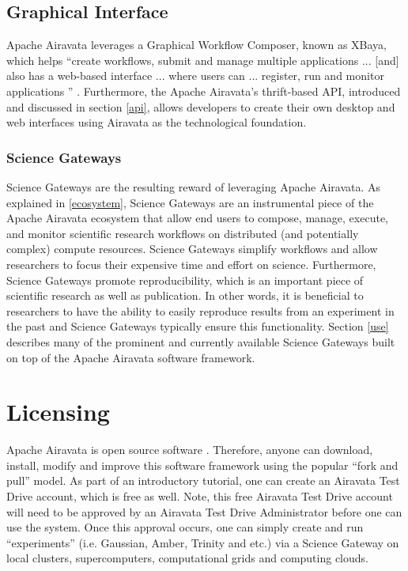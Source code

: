\documentclass[9pt,twocolumn,twoside]{styles/osajnl}
\begin{document}
\subsection{Graphical Interface} \label{graphical}
Apache Airavata leverages a Graphical Workflow Composer, known as
XBaya, which helps ``create workflows, submit and manage multiple
applications ... [and] also has a web-based interface ... where users
can ... register, run and monitor applications ''
\cite{www-documentation}. Furthermore, the Apache Airavata's
thrift-based API, introduced and discussed in section \ref{api},
allows developers to create their own desktop and web interfaces using
Airavata as the technological foundation.

\subsubsection{Science Gateways} \label{science}
Science Gateways are the resulting reward of leveraging Apache
Airavata. As explained in \ref{ecosystem}, Science Gateways are an
instrumental piece of the Apache Airavata ecosystem that allow end
users to compose, manage, execute, and monitor scientific research
workflows on distributed (and potentially complex) compute
resources. Science Gateways simplify workflows and allow researchers
to focus their expensive time and effort on science. Furthermore,
Science Gateways promote reproducibility, which is an important piece
of scientific research as well as publication. In other words, it is
beneficial to researchers to have the ability to easily reproduce
results from an experiment in the past and Science Gateways typically
ensure this functionality. Section \ref{use} describes many of the
prominent and currently available Science Gateways built on top of the
Apache Airavata software framework.

\section{Licensing} \label{licensing}
Apache Airavata is open source software \cite{www-source}. Therefore,
anyone can download, install, modify and improve this software
framework using the popular ``fork and pull'' model. As part of an
introductory tutorial, one can create an Airavata Test Drive account,
which is free as well. Note, this free Airavata Test Drive account
will need to be approved by an Airavata Test Drive Administrator
before one can use the system. Once this approval occurs, one can
simply create and run ``experiments'' (i.e. Gaussian, Amber, Trinity
and etc.) via a Science Gateway on local clusters, supercomputers,
computational grids and computing clouds.
\end{document}
